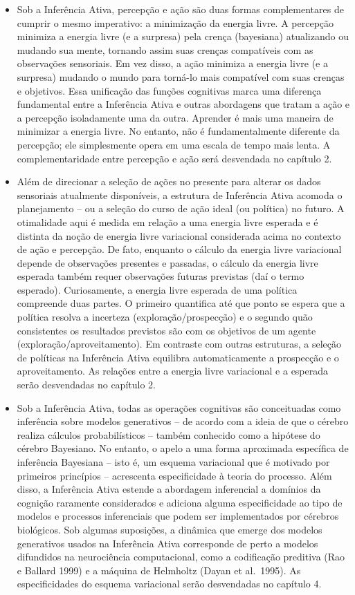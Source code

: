 \documentclass[
  12pt,
]{book}
\begin{document}
\begin{itemize}
\item
  Sob a Inferência Ativa, percepção e ação são duas formas complementares de cumprir o mesmo imperativo: a minimização da energia livre. A percepção minimiza a energia livre (e a surpresa) pela crença (bayesiana) atualizando ou mudando sua mente, tornando assim suas crenças compatíveis com as observações sensoriais. Em vez disso, a ação minimiza a energia livre (e a surpresa) mudando o mundo para torná-lo mais compatível com suas crenças e objetivos. Essa unificação das funções cognitivas marca uma diferença fundamental entre a Inferência Ativa e outras abordagens que tratam a ação e a percepção isoladamente uma da outra. Aprender é mais uma maneira de minimizar a energia livre. No entanto, não é fundamentalmente diferente da percepção; ele simplesmente opera em uma escala de tempo mais lenta. A complementaridade entre percepção e ação será desvendada no capítulo 2.
\item
  Além de direcionar a seleção de ações no presente para alterar os dados sensoriais atualmente disponíveis, a estrutura de Inferência Ativa acomoda o planejamento -- ou a seleção do curso de ação ideal (ou política) no futuro. A otimalidade aqui é medida em relação a uma energia livre esperada e é distinta da noção de energia livre variacional considerada acima no contexto de ação e percepção. De fato, enquanto o cálculo da energia livre variacional depende de observações presentes e passadas, o cálculo da energia livre esperada também requer observações futuras previstas (daí o termo esperado). Curiosamente, a energia livre esperada de uma política compreende duas partes. O primeiro quantifica até que ponto se espera que a política resolva a incerteza (exploração/prospecção) e o segundo quão consistentes os resultados previstos são com os objetivos de um agente (exploração/aproveitamento). Em contraste com outras estruturas, a seleção de políticas na Inferência Ativa equilibra automaticamente a prospecção e o aproveitamento. As relações entre a energia livre variacional e a esperada serão desvendadas no capítulo 2.
\item
  Sob a Inferência Ativa, todas as operações cognitivas são conceituadas como inferência sobre modelos generativos -- de acordo com a ideia de que o cérebro realiza cálculos probabilísticos -- também conhecido como a hipótese do cérebro Bayesiano. No entanto, o apelo a uma forma aproximada específica de inferência Bayesiana -- isto é, um esquema variacional que é motivado por primeiros princípios -- acrescenta especificidade à teoria do processo. Além disso, a Inferência Ativa estende a abordagem inferencial a domínios da cognição raramente considerados e adiciona alguma especificidade ao tipo de modelos e processos inferenciais que podem ser implementados por cérebros biológicos. Sob algumas suposições, a dinâmica que emerge dos modelos generativos usados na Inferência Ativa corresponde de perto a modelos difundidos na neurociência computacional, como a codificação preditiva (Rao e Ballard 1999) e a máquina de Helmholtz (Dayan et al.~1995). As especificidades do esquema variacional serão desvendadas no capítulo 4.

\end{itemize}
\end{document}

